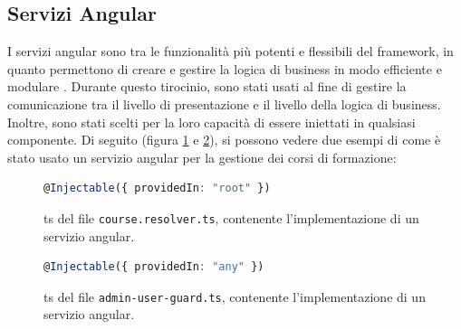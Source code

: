 \subsection{Servizi Angular}\label{subsec:servizi-angular}
I servizi \gls{angular} sono tra le funzionalità più potenti e flessibili del \gls{framework}, in quanto permettono di creare e gestire la logica di business in modo efficiente e modulare \cite{angserv}. Durante questo tirocinio, sono stati usati al fine di gestire la comunicazione tra il livello di presentazione e il livello della logica di business. Inoltre, sono stati scelti per la loro capacità di essere iniettati in qualsiasi componente.
Di seguito (figura \ref{fig:angular service} e \ref{fig:angular service 2}), si possono vedere due esempi di come è stato usato un servizio \gls{angular} per la gestione dei corsi di formazione:
\begin{figure}[H]
\centering
\begin{lstlisting}[language=TypeScript]
  @Injectable({ providedIn: "root" })
\end{lstlisting}
\caption{\label{fig:angular service}\acrlong{ts} del file \texttt{course.resolver.ts}, contenente l'implementazione di un servizio \gls{angular}.}
\end{figure}

\begin{figure}[H]
\centering
\begin{lstlisting}[language=TypeScript]
  @Injectable({ providedIn: "any" })
\end{lstlisting}
\caption{\label{fig:angular service 2}\acrlong{ts} del file \texttt{admin-user-guard.ts}, contenente l'implementazione di un servizio \gls{angular}.}
\end{figure}

